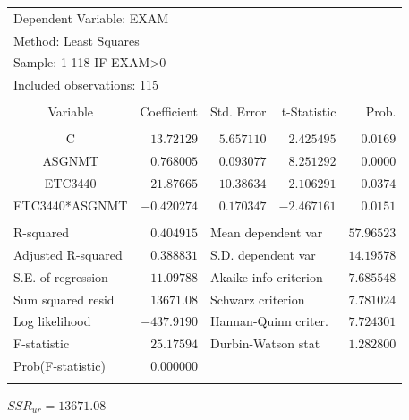 \documentclass[12pt]{report}
\begin{document}
\begin{table}[H]
	\centering
	\begin{tabular}{lrrrr}
		\multicolumn{3}{l}{Dependent Variable: EXAM}&\multicolumn{1}{c}{}&\multicolumn{1}{c}{}\\
		\multicolumn{3}{l}{Method: Least Squares}&\multicolumn{1}{c}{}&\multicolumn{1}{c}{}\\
		\multicolumn{3}{l}{Sample: 1 118 IF EXAM\textgreater 0}&\multicolumn{1}{c}{}&\multicolumn{1}{c}{}\\
		\multicolumn{3}{l}{Included observations: 115}&\multicolumn{1}{c}{}&\multicolumn{1}{c}{}\\
		[4.5pt] \hline \\ [-4.5pt]
		\multicolumn{1}{c}{Variable}&\multicolumn{1}{r}{Coefficient}&\multicolumn{1}{r}{Std. Error}&\multicolumn{1}{r}{t-Statistic}&\multicolumn{1}{r}{Prob.}\\
		[4.5pt] \hline \\ [-4.5pt]
		\multicolumn{1}{c}{C}&\multicolumn{1}{r}{$13.72129$}&\multicolumn{1}{r}{$5.657110$}&\multicolumn{1}{r}{$2.425495$}&\multicolumn{1}{r}{$0.0169$}\\
		\multicolumn{1}{c}{ASGNMT}&\multicolumn{1}{r}{$0.768005$}&\multicolumn{1}{r}{$0.093077$}&\multicolumn{1}{r}{$8.251292$}&\multicolumn{1}{r}{$0.0000$}\\
		\multicolumn{1}{c}{ETC3440}&\multicolumn{1}{r}{$21.87665$}&\multicolumn{1}{r}{$10.38634$}&\multicolumn{1}{r}{$2.106291$}&\multicolumn{1}{r}{$0.0374$}\\
		\multicolumn{1}{c}{ETC3440*ASGNMT}&\multicolumn{1}{r}{$-0.420274$}&\multicolumn{1}{r}{$0.170347$}&\multicolumn{1}{r}{$-2.467161$}&\multicolumn{1}{r}{$0.0151$}\\
		[4.5pt] \hline \\ [-4.5pt]
		\multicolumn{1}{l}{R-squared}&\multicolumn{1}{r}{$0.404915$}&\multicolumn{2}{l}{Mean dependent var}&\multicolumn{1}{r}{$57.96523$}\\
		\multicolumn{1}{l}{Adjusted R-squared}&\multicolumn{1}{r}{$0.388831$}&\multicolumn{2}{l}{S.D. dependent var}&\multicolumn{1}{r}{$14.19578$}\\
		\multicolumn{1}{l}{S.E. of regression}&\multicolumn{1}{r}{$11.09788$}&\multicolumn{2}{l}{Akaike info criterion}&\multicolumn{1}{r}{$7.685548$}\\
		\multicolumn{1}{l}{Sum squared resid}&\multicolumn{1}{r}{$13671.08$}&\multicolumn{2}{l}{Schwarz criterion}&\multicolumn{1}{r}{$7.781024$}\\
		\multicolumn{1}{l}{Log likelihood}&\multicolumn{1}{r}{$-437.9190$}&\multicolumn{2}{l}{Hannan-Quinn criter.}&\multicolumn{1}{r}{$7.724301$}\\
		\multicolumn{1}{l}{F-statistic}&\multicolumn{1}{r}{$25.17594$}&\multicolumn{2}{l}{Durbin-Watson stat}&\multicolumn{1}{r}{$1.282800$}\\
		\multicolumn{1}{l}{Prob(F-statistic)}&\multicolumn{1}{r}{$0.000000$}&\multicolumn{1}{c}{}&\multicolumn{1}{c}{}&\multicolumn{1}{c}{}\\
		[4.5pt] \hline \\ [-4.5pt]
	\end{tabular}
\end{table} \centering $SSR_{ur} = 13671.08$
\end{document}
